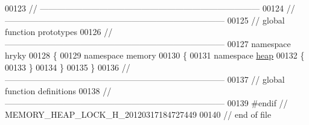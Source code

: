 \begin{DoxyCode}
00123 \textcolor{comment}{//
      ------------------------------------------------------------------------------}
00124 \textcolor{comment}{//
      ------------------------------------------------------------------------------}
00125 \textcolor{comment}{// global function prototypes}
00126 \textcolor{comment}{//
      ------------------------------------------------------------------------------}
00127 \textcolor{keyword}{namespace }hryky
00128 \{
00129 \textcolor{keyword}{namespace }memory
00130 \{
00131 \textcolor{keyword}{namespace }\hyperlink{namespacehryky_1_1memory_1_1global_a6fc6103f67c837aa0f39b359588409cd}{heap}
00132 \{
00133 \}
00134 \}
00135 \}
00136 \textcolor{comment}{//
      ------------------------------------------------------------------------------}
00137 \textcolor{comment}{// global function definitions}
00138 \textcolor{comment}{//
      ------------------------------------------------------------------------------}
00139 \textcolor{preprocessor}{#endif // MEMORY\_HEAP\_LOCK\_H\_20120317184727449}
00140 \textcolor{preprocessor}{}\textcolor{comment}{// end of file}
\end{DoxyCode}

